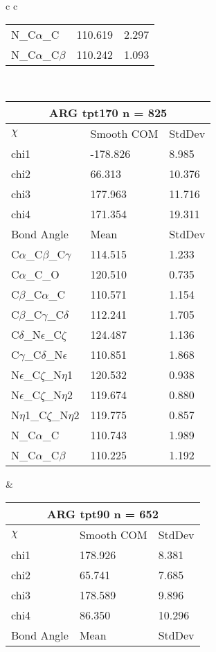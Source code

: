\begin{longtable}{ c c }
\begin{tabular}{ l l l }
  N\_C$\alpha$\_C & 110.619 & 2.297\\
  N\_C$\alpha$\_C$\beta$ & 110.242 & 1.093\\
  \bottomrule
  \end{tabular}
  \\
  \begin{tabular}{ l l l }
  \toprule
  \multicolumn{3}{c}{ARG \textbf{tpt170} n = 825} \\ \toprule
  $\chi$       & Smooth COM & StdDev \\ \midrule
  chi1 & -178.826 & 8.985 \\ 
  chi2 & 66.313 & 10.376 \\ 
  chi3 & 177.963 & 11.716 \\ 
  chi4 & 171.354 & 19.311 \\ \midrule
  Bond Angle   & Mean     & StdDev \\ \midrule
  C$\alpha$\_C$\beta$\_C$\gamma$ & 114.515 & 1.233\\
  C$\alpha$\_C\_O & 120.510 & 0.735\\
  C$\beta$\_C$\alpha$\_C & 110.571 & 1.154\\
  C$\beta$\_C$\gamma$\_C$\delta$ & 112.241 & 1.705\\
  C$\delta$\_N$\epsilon$\_C$\zeta$ & 124.487 & 1.136\\
  C$\gamma$\_C$\delta$\_N$\epsilon$ & 110.851 & 1.868\\
  N$\epsilon$\_C$\zeta$\_N$\eta$1 & 120.532 & 0.938\\
  N$\epsilon$\_C$\zeta$\_N$\eta$2 & 119.674 & 0.880\\
  N$\eta$1\_C$\zeta$\_N$\eta$2 & 119.775 & 0.857\\
  N\_C$\alpha$\_C & 110.743 & 1.989\\
  N\_C$\alpha$\_C$\beta$ & 110.225 & 1.192\\
  \bottomrule
  \end{tabular}
  &
  \begin{tabular}{ l l l }
  \toprule
  \multicolumn{3}{c}{ARG \textbf{tpt90} n = 652} \\ \toprule
  $\chi$       & Smooth COM & StdDev \\ \midrule
  chi1 & 178.926 & 8.381 \\ 
  chi2 & 65.741 & 7.685 \\ 
  chi3 & 178.589 & 9.896 \\ 
  chi4 & 86.350 & 10.296 \\ \midrule
  Bond Angle   & Mean     & StdDev \\ \midrule

\end{tabular}
\end{longtable}
